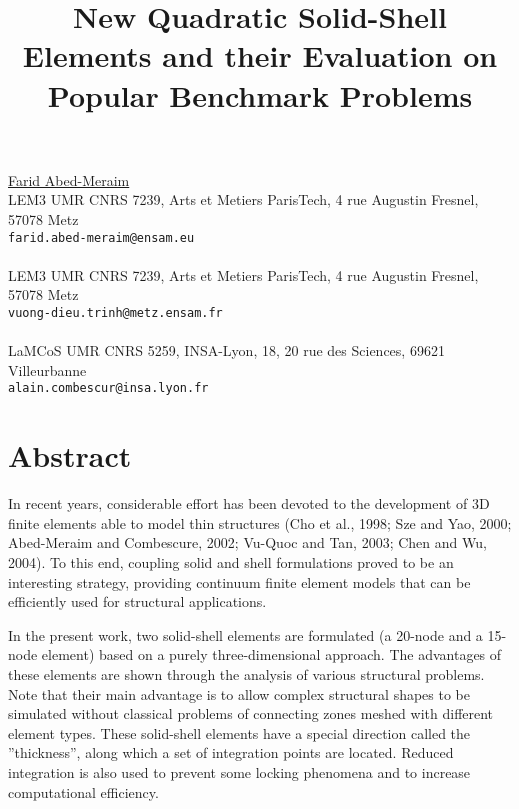 \title{New Quadratic Solid-Shell Elements and their Evaluation on Popular Benchmark Problems}
 \author{} \institute{}
\maketitle
\begin{center}
{\large \underline{Farid Abed-Meraim}}\\
LEM3 UMR CNRS 7239, Arts et Metiers ParisTech, 4 rue Augustin Fresnel, 57078 Metz\\
{\tt farid.abed-meraim@ensam.eu}
\\ \vspace{4mm}{\large Vuong-Dieu Trinh}\\
LEM3 UMR CNRS 7239, Arts et Metiers ParisTech, 4 rue Augustin Fresnel, 57078 Metz\\
{\tt vuong-dieu.trinh@metz.ensam.fr}
\\ \vspace{4mm}{\large Alain Combescure}\\
LaMCoS UMR CNRS 5259, INSA-Lyon, 18, 20 rue des Sciences, 69621 Villeurbanne\\
{\tt alain.combescur@insa.lyon.fr}

\end{center}

\section*{Abstract}

In recent years, considerable effort has been devoted to the development of 3D finite elements able to model thin structures (Cho et al., 1998; Sze and Yao, 2000; Abed-Meraim and Combescure, 2002; Vu-Quoc and Tan, 2003; Chen and Wu, 2004). To this end, coupling solid and shell formulations proved to be an interesting strategy, providing continuum finite element models that can be efficiently used for structural applications.

In the present work, two solid-shell elements are formulated (a 20-node and a 15-node element) based on a purely three-dimensional approach. The advantages of these elements are shown through the analysis of various structural problems. Note that their main advantage is to allow complex structural shapes to be simulated without classical problems of connecting zones meshed with different element types. These solid-shell elements have a special direction called the ''thickness'', along which a set of integration points are located. Reduced integration is also used to prevent some locking phenomena and to increase computational efficiency.

